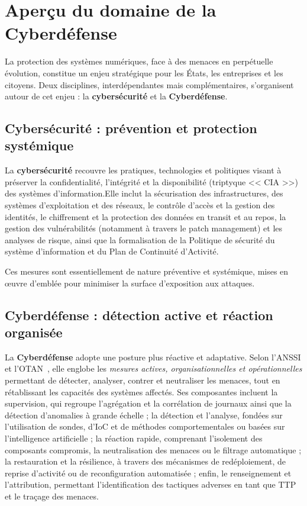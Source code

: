 \section{Aperçu du domaine de la Cyberdéfense}\label{sec:cyberdef-panorama}

La protection des systèmes numériques, face à des menaces en perpétuelle évolution, constitue un enjeu stratégique pour les États, les entreprises et les citoyens. Deux disciplines, interdépendantes mais complémentaires, s'organisent autour de cet enjeu : la \textbf{cybersécurité} et la \textbf{Cyberdéfense}.

\subsection*{Cybersécurité : prévention et protection systémique}

La \textbf{cybersécurité} recouvre les pratiques, technologies et politiques visant à préserver la confidentialité, l'intégrité et la disponibilité (triptyque << \ac{CIA} >>) des systèmes d'information.Elle inclut la sécurisation des infrastructures, des systèmes d'exploitation et des réseaux, le contrôle d'accès et la gestion des identités, le chiffrement et la protection des données en transit et au repos, la gestion des vulnérabilités (notamment à travers le patch management) et les analyses de risque, ainsi que la formalisation de la Politique de sécurité du système d'information et du Plan de Continuité d'Activité.

Ces mesures sont essentiellement de nature préventive et systémique, mises en œuvre d'emblée pour minimiser la surface d'exposition aux attaques.

\subsection*{Cyberdéfense : détection active et réaction organisée}

La \textbf{Cyberdéfense} adopte une posture plus réactive et adaptative. Selon l'\ac{ANSSI} et l'\ac{OTAN}~\cite{ANSSI2024,NATO2016Cyberdef}, elle englobe les \emph{mesures actives, organisationnelles et opérationnelles} permettant de détecter, analyser, contrer et neutraliser les menaces, tout en rétablissant les capacités des systèmes affectés. Ses composantes incluent la supervision, qui regroupe l'agrégation et la corrélation de journaux ainsi que la détection d'anomalies à grande échelle ; la détection et l'analyse, fondées sur l'utilisation de sondes, d'\ac{IoC} et de méthodes comportementales ou basées sur l'intelligence artificielle ; la réaction rapide, comprenant l'isolement des composants compromis, la neutralisation des menaces ou le filtrage automatique ; la restauration et la résilience, à travers des mécanismes de redéploiement, de reprise d'activité ou de reconfiguration automatisée ; enfin, le renseignement et l'attribution, permettant l'identification des tactiques adverses en tant que \ac{TTP} et le traçage des menaces.

